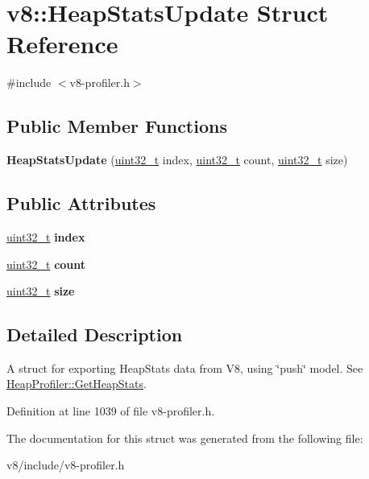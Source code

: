\hypertarget{structv8_1_1HeapStatsUpdate}{}\section{v8\+:\+:Heap\+Stats\+Update Struct Reference}
\label{structv8_1_1HeapStatsUpdate}


{\ttfamily \#include $<$v8-\/profiler.\+h$>$}

\subsection*{Public Member Functions}
\begin{DoxyCompactItemize}
\item 
\mbox{\label{structv8_1_1HeapStatsUpdate_aba606181fa7071647cc91a558c450cf3}} 
{\bfseries Heap\+Stats\+Update} (\mbox{\hyperlink{classuint32__t}{uint32\+\_\+t}} index, \mbox{\hyperlink{classuint32__t}{uint32\+\_\+t}} count, \mbox{\hyperlink{classuint32__t}{uint32\+\_\+t}} size)
\end{DoxyCompactItemize}
\subsection*{Public Attributes}
\begin{DoxyCompactItemize}
\item 
\mbox{\label{structv8_1_1HeapStatsUpdate_a90f427acc6e9b8cf2001ca09541545d7}} 
\mbox{\hyperlink{classuint32__t}{uint32\+\_\+t}} {\bfseries index}
\item 
\mbox{\label{structv8_1_1HeapStatsUpdate_aa74badb1bd196e538b45b971350c33de}} 
\mbox{\hyperlink{classuint32__t}{uint32\+\_\+t}} {\bfseries count}
\item 
\mbox{\label{structv8_1_1HeapStatsUpdate_a842a199bd372f411f0ae5816e38c45e2}} 
\mbox{\hyperlink{classuint32__t}{uint32\+\_\+t}} {\bfseries size}
\end{DoxyCompactItemize}


\subsection{Detailed Description}
A struct for exporting Heap\+Stats data from V8, using \char`\"{}push\char`\"{} model. See \mbox{\hyperlink{classv8_1_1HeapProfiler_add093717acd067daeddb7ef5fc8b191a}{Heap\+Profiler\+::\+Get\+Heap\+Stats}}. 

Definition at line 1039 of file v8-\/profiler.\+h.



The documentation for this struct was generated from the following file\+:\begin{DoxyCompactItemize}
\item 
v8/include/v8-\/profiler.\+h\end{DoxyCompactItemize}

